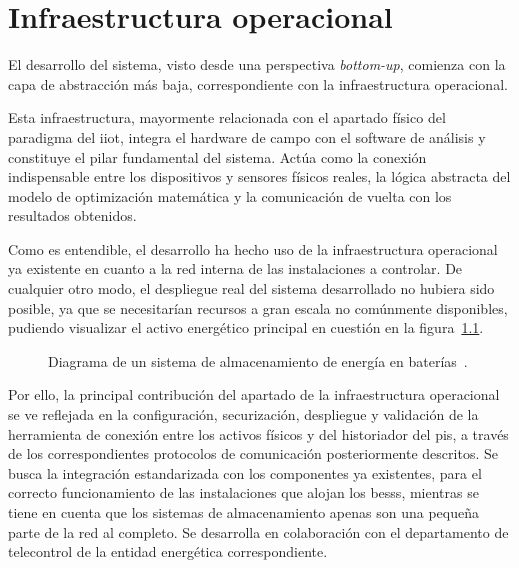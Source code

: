
\cleardoublepage%

\chapter{Infraestructura operacional}%
\label{makereference3}

El desarrollo del sistema, visto desde una perspectiva \textit{bottom-up}, comienza con la capa de abstracción más baja, correspondiente con la infraestructura operacional.

Esta infraestructura, mayormente relacionada con el apartado físico del paradigma del \gls{iiot}, integra el hardware de campo con el software de análisis y constituye el pilar fundamental del sistema. Actúa como la conexión indispensable entre los dispositivos y sensores físicos reales, la lógica abstracta del modelo de optimización matemática y la comunicación de vuelta con los resultados obtenidos.

Como es entendible, el desarrollo ha hecho uso de la infraestructura operacional ya existente en cuanto a la red interna de las instalaciones a controlar. De cualquier otro modo, el despliegue real del sistema desarrollado no hubiera sido posible, ya que se necesitarían recursos a gran escala no comúnmente disponibles, pudiendo visualizar el activo energético principal en cuestión en la figura~\ref{fig:diagrama-bess}.

\begin{figure}
  \centering
  
  \caption[Diagrama de un sistema de almacenamiento de energía en baterías.]{Diagrama de un sistema de almacenamiento de energía en baterías~\cite{iberdrola2024bess}.}%
  \label{fig:diagrama-bess}
\end{figure}

Por ello, la principal contribución del apartado de la infraestructura operacional se ve reflejada en la configuración, securización, despliegue y validación de la herramienta de conexión entre los activos físicos y del historiador del \gls{pis}, a través de los correspondientes protocolos de comunicación posteriormente descritos. Se busca la integración estandarizada con los componentes ya existentes, para el correcto funcionamiento de las instalaciones que alojan los \glspl{bess}, mientras se tiene en cuenta que los sistemas de almacenamiento apenas son una pequeña parte de la red al completo. Se desarrolla en colaboración con el departamento de telecontrol de la entidad energética correspondiente.

